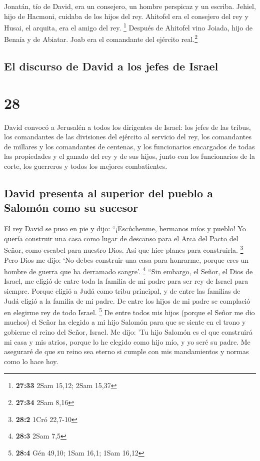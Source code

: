 Jonatán, tío de David, era un consejero, un hombre
perspicaz y un escriba. Jehiel, hijo de Hacmoni, cuidaba de los hijos
del rey.  Ahitofel era el consejero del rey y Husai, el
arquita, era el amigo del rey. \footnote{\textbf{27:33} 2Sam 15,12; 2Sam
  15,37}  Después de Ahitofel vino Joiada, hijo de Benaía
y de Abiatar. Joab era el comandante del ejército real.\footnote{\textbf{27:34}
  2Sam 8,16}

\hypertarget{el-discurso-de-david-a-los-jefes-de-israel}{%
\subsection{El discurso de David a los jefes de
Israel}\label{el-discurso-de-david-a-los-jefes-de-israel}}

\hypertarget{section-27}{%
\section{28}\label{section-27}}

 David convocó a Jerusalén a todos los dirigentes de
Israel: los jefes de las tribus, los comandantes de las divisiones del
ejército al servicio del rey, los comandantes de millares y los
comandantes de centenas, y los funcionarios encargados de todas las
propiedades y el ganado del rey y de sus hijos, junto con los
funcionarios de la corte, los guerreros y todos los mejores
combatientes.

\hypertarget{david-presenta-al-superior-del-pueblo-a-salomuxf3n-como-su-sucesor}{%
\subsection{David presenta al superior del pueblo a Salomón como su
sucesor}\label{david-presenta-al-superior-del-pueblo-a-salomuxf3n-como-su-sucesor}}

 El rey David se puso en pie y dijo: ``¡Escúchenme,
hermanos míos y pueblo! Yo quería construir una casa como lugar de
descanso para el Arca del Pacto del Señor, como escabel para nuestro
Dios. Así que hice planes para construirla. \footnote{\textbf{28:2} 1Cró
  22,7-10}  Pero Dios me dijo: `No debes construir una
casa para honrarme, porque eres un hombre de guerra que ha derramado
sangre'. \footnote{\textbf{28:3} 2Sam 7,5}  ``Sin embargo,
el Señor, el Dios de Israel, me eligió de entre toda la familia de mi
padre para ser rey de Israel para siempre. Porque eligió a Judá como
tribu principal, y de entre las familias de Judá eligió a la familia de
mi padre. De entre los hijos de mi padre se complació en elegirme rey de
todo Israel. \footnote{\textbf{28:4} Gén 49,10; 1Sam 16,1; 1Sam 16,12}
 De entre todos mis hijos (porque el Señor me dio muchos)
el Señor ha elegido a mi hijo Salomón para que se siente en el trono y
gobierne el reino del Señor, Israel.  Me dijo: 'Tu hijo
Salomón es el que construirá mi casa y mis atrios, porque lo he elegido
como hijo mío, y yo seré su padre.  Me aseguraré de que su
reino sea eterno si cumple con mis mandamientos y normas como lo hace
hoy.

